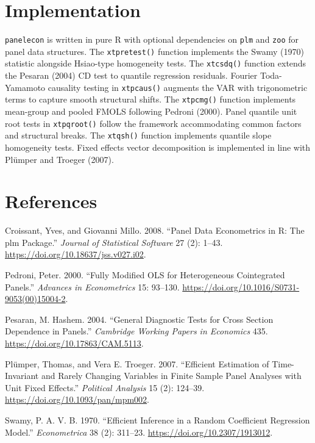 \section{Implementation}\label{implementation}

\texttt{panelecon} is written in pure R with optional dependencies on
\texttt{plm} and \texttt{zoo} for panel data structures. The
\texttt{xtpretest()} function implements the Swamy (1970) statistic
alongside Hsiao-type homogeneity tests. The \texttt{xtcsdq()} function
extends the Pesaran (2004) CD test to quantile regression residuals.
Fourier Toda-Yamamoto causality testing in \texttt{xtpcaus()} augments
the VAR with trigonometric terms to capture smooth structural shifts.
The \texttt{xtpcmg()} function implements mean-group and pooled FMOLS
following Pedroni (2000). Panel quantile unit root tests in
\texttt{xtpqroot()} follow the framework accommodating common factors
and structural breaks. The \texttt{xtqsh()} function implements quantile
slope homogeneity tests. Fixed effects vector decomposition is
implemented in line with Plümper and Troeger (2007).

\section*{References}\label{references}

\protect{}\label{refs}
\begin{CSLReferences}{1}{1}
Croissant, Yves, and Giovanni Millo. 2008. {``Panel Data Econometrics in
{R}: The {plm} Package.''} \emph{Journal of Statistical Software} 27
(2): 1--43. \url{https://doi.org/10.18637/jss.v027.i02}.

Pedroni, Peter. 2000. {``Fully Modified {OLS} for Heterogeneous
Cointegrated Panels.''} \emph{Advances in Econometrics} 15: 93--130.
\url{https://doi.org/10.1016/S0731-9053(00)15004-2}.

Pesaran, M. Hashem. 2004. {``General Diagnostic Tests for Cross Section
Dependence in Panels.''} \emph{Cambridge Working Papers in Economics}
435. \url{https://doi.org/10.17863/CAM.5113}.

Plümper, Thomas, and Vera E. Troeger. 2007. {``Efficient Estimation of
Time-Invariant and Rarely Changing Variables in Finite Sample Panel
Analyses with Unit Fixed Effects.''} \emph{Political Analysis} 15 (2):
124--39. \url{https://doi.org/10.1093/pan/mpm002}.

Swamy, P. A. V. B. 1970. {``Efficient Inference in a Random Coefficient
Regression Model.''} \emph{Econometrica} 38 (2): 311--23.
\url{https://doi.org/10.2307/1913012}.

\end{CSLReferences}
